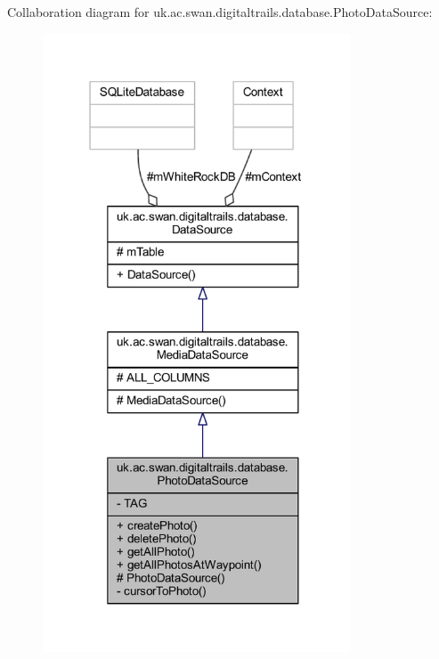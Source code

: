 Collaboration diagram for uk.\+ac.\+swan.\+digitaltrails.\+database.\+Photo\+Data\+Source\+:
\nopagebreak
\begin{figure}[H]
\begin{center}
\leavevmode
\includegraphics[width=259pt]{classuk_1_1ac_1_1swan_1_1digitaltrails_1_1database_1_1_photo_data_source__coll__graph}
\end{center}
\end{figure}
